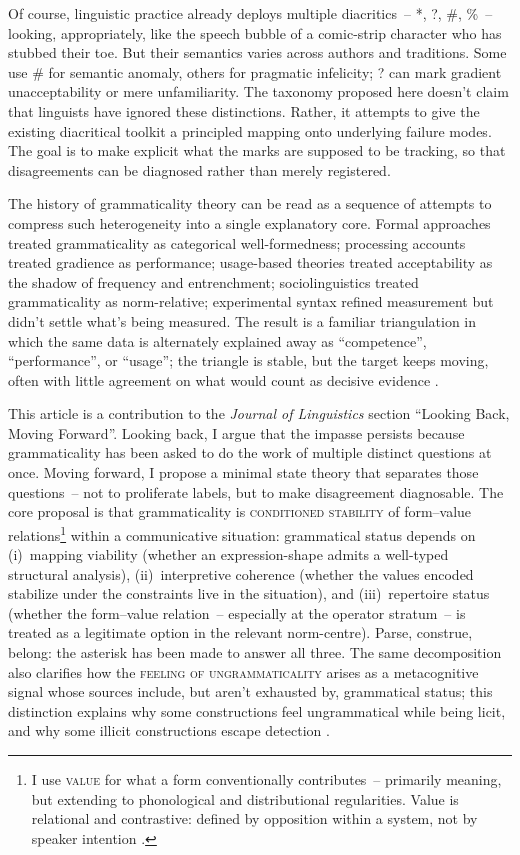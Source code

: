 \documentclass[12pt,letterpaper]{article}
\newcommand{\term}[1]{\textsc{#1}}
\begin{document}
Of course, linguistic practice already deploys multiple diacritics~-- *, ?, \#, \%~-- looking, appropriately, like the speech bubble of a comic-strip character who has stubbed their toe. But their semantics varies across authors and traditions. Some use \# for semantic anomaly, others for pragmatic infelicity; ? can mark gradient unacceptability or mere unfamiliarity. The taxonomy proposed here doesn't claim that linguists have ignored these distinctions. Rather, it attempts to give the existing diacritical toolkit a principled mapping onto underlying failure modes. The goal is to make explicit what the marks are supposed to be tracking, so that disagreements can be diagnosed rather than merely registered.

The history of grammaticality theory can be read as a sequence of attempts to compress such heterogeneity into a single explanatory core. Formal approaches treated grammaticality as categorical well-formedness; processing accounts treated gradience as performance; usage-based theories treated acceptability as the shadow of frequency and entrenchment; sociolinguistics treated grammaticality as norm-relative; experimental syntax refined measurement but didn't settle what's being measured. The result is a familiar triangulation in which the same data is alternately explained away as \enquote{competence}, \enquote{performance}, or \enquote{usage}; the triangle is stable, but the target keeps moving, often with little agreement on what would count as decisive evidence \autocite{schutze2016, sprouse2013}.

This article is a contribution to the \textit{Journal of Linguistics} section \enquote{Looking Back, Moving Forward}. Looking back, I argue that the impasse persists because grammaticality has been asked to do the work of multiple distinct questions at once. Moving forward, I propose a minimal state theory that separates those questions~-- not to proliferate labels, but to make disagreement diagnosable. The core proposal is that grammaticality is \term{conditioned stability} of form--value relations\footnote{I use \term{value} for what a form conventionally contributes~-- primarily meaning, but extending to phonological and distributional regularities. Value is relational and contrastive: defined by opposition within a system, not by speaker intention \autocite{saussure1916}.} within a communicative situation: grammatical status depends on (i)~mapping viability (whether an expression-shape admits a well-typed structural analysis), (ii)~interpretive coherence (whether the values encoded stabilize under the constraints live in the situation), and (iii)~repertoire status (whether the form--value relation~-- especially at the operator stratum~-- is treated as a legitimate option in the relevant norm-centre). Parse, construe, belong: the asterisk has been made to answer all three. The same decomposition also clarifies how the \term{feeling of ungrammaticality} arises as a metacognitive signal whose sources include, but aren't exhausted by, grammatical status; this distinction explains why some constructions feel ungrammatical while being licit, and why some illicit constructions escape detection \autocite{Fanselow2021}.
\end{document}
